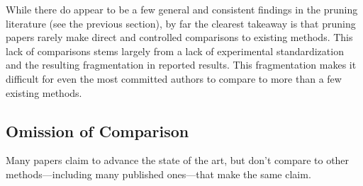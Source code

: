 
While there do appear to be a few general and consistent findings in the pruning literature (see the previous section), by far the clearest takeaway is that pruning papers rarely make direct and controlled comparisons to existing methods. This lack of comparisons stems largely from a lack of experimental standardization and the resulting fragmentation in reported results. This fragmentation makes it difficult for even the most committed authors to compare to more than a few existing methods.


\subsection{Omission of Comparison}

Many papers claim to advance the state of the art, but don't compare to other methods---including many published ones---that make the same claim. %


